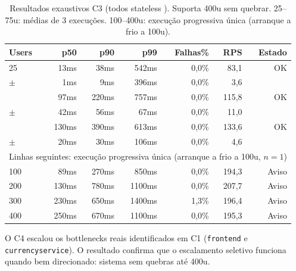 \documentclass[manuscript,oneside]{acmart}
\begin{document}
\begin{table}[H]
\caption{Resultados exaustivos C3 (todos stateless ). Suporta 400u sem quebrar. 25--75u: médias de 3 execuções. 100--400u: execução progressiva única (arranque a frio a 100u).}
\label{tab:c3ex}
\begin{tabular}{lrrrrrr}
\toprule
\textbf{Users} & \textbf{p50} & \textbf{p90} & \textbf{p99} & \textbf{Falhas\%} & \textbf{RPS} & \textbf{Estado} \\
\midrule
25  & 13ms & 38ms  & 542ms  & 0,0\% & 83,1  & OK \\
{\scriptsize$\pm$} & {\scriptsize1ms} & {\scriptsize9ms} & {\scriptsize396ms} & {\scriptsize0,0\%} & {\scriptsize3,6} & \\[-4pt]
\addlinespace[2pt]
50  & 97ms & 220ms & 757ms  & 0,0\% & 115,8 & OK \\
{\scriptsize$\pm$} & {\scriptsize42ms} & {\scriptsize56ms} & {\scriptsize67ms} & {\scriptsize0,0\%} & {\scriptsize11,0} & \\[-4pt]
\addlinespace[2pt]
75  & 130ms & 390ms & 613ms & 0,0\% & 133,6 & OK \\
{\scriptsize$\pm$} & {\scriptsize20ms} & {\scriptsize30ms} & {\scriptsize106ms} & {\scriptsize0,0\%} & {\scriptsize4,6} & \\[-4pt]
\midrule
\multicolumn{7}{l}{\scriptsize Linhas seguintes: execução progressiva única (arranque a frio a 100u, $n=1$)} \\[-3pt]
\midrule
100 & 89ms & 270ms & 850ms & 0,0\% & 194,3 & Aviso \\
200 & 130ms & 780ms & 1100ms & 0,0\% & 207,7 & Aviso \\
300 & 230ms & 650ms & 1400ms & 1,3\% & 196,4 & Aviso \\
400 & 250ms & 670ms & 1100ms & 0,0\% & 195,3 & Aviso \\
\bottomrule
\end{tabular}
\end{table}

O C4 escalou os bottlenecks reais identificados em C1 (\texttt{frontend} e \texttt{currencyservice}). O resultado confirma que o escalamento seletivo funciona quando bem direcionado: sistema sem quebras até 400u.
\end{document}
